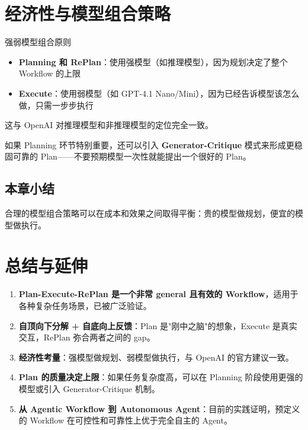 \documentclass[a4paper]{article}
\begin{document}
\section{经济性与模型组合策略}

\begin{importantbox}{强弱模型组合原则}
\begin{itemize}
    \item \textbf{Planning 和 RePlan}：使用强模型（如推理模型），因为规划决定了整个 Workflow 的上限
    \item \textbf{Execute}：使用弱模型（如 GPT-4.1 Nano/Mini），因为已经告诉模型该怎么做，只需一步步执行
\end{itemize}
这与 OpenAI 对推理模型和非推理模型的定位完全一致。
\end{importantbox}

如果 Planning 环节特别重要，还可以引入 \textbf{Generator-Critique} 模式来形成更稳固可靠的 Plan——不要预期模型一次性就能提出一个很好的 Plan。

\subsection{本章小结}

合理的模型组合策略可以在成本和效果之间取得平衡：贵的模型做规划，便宜的模型做执行。

\section{总结与延伸}

\begin{enumerate}
    \item \textbf{Plan-Execute-RePlan 是一个非常 general 且有效的 Workflow}，适用于各种复杂任务场景，已被广泛验证。
    \item \textbf{自顶向下分解 + 自底向上反馈}：Plan 是"刚中之脑"的想象，Execute 是真实交互，RePlan 弥合两者之间的 gap。
    \item \textbf{经济性考量}：强模型做规划、弱模型做执行，与 OpenAI 的官方建议一致。
    \item \textbf{Plan 的质量决定上限}：如果任务复杂度高，可以在 Planning 阶段使用更强的模型或引入 Generator-Critique 机制。
    \item \textbf{从 Agentic Workflow 到 Autonomous Agent}：目前的实践证明，预定义的 Workflow 在可控性和可靠性上优于完全自主的 Agent。
\end{enumerate}
\end{document}
